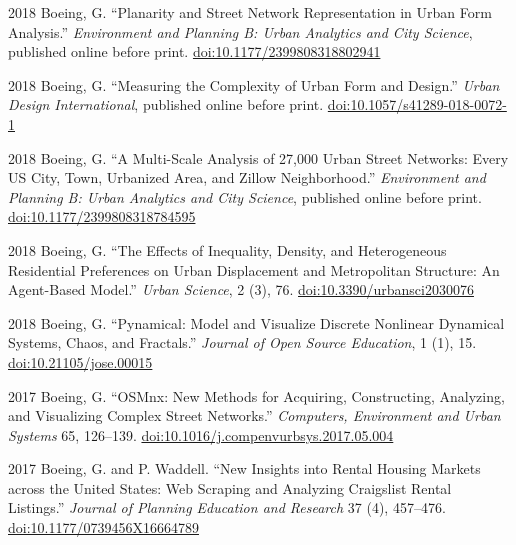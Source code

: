 \documentclass[12pt,letterpaper]{report}
\begin{document}
	\begin{tablist}
		
		\item[2018] \tab Boeing, G. \enquote{Planarity and Street Network Representation in Urban Form Analysis.} \textit{Environment and Planning B: Urban Analytics and City Science}, published online before print. \href{https://doi.org/10.1177/2399808318802941}{doi:10.1177/2399808318802941}
		
		\item[2018] \tab Boeing, G. \enquote{Measuring the Complexity of Urban Form and Design.} \textit{Urban Design International}, published online before print. \href{https://doi.org/10.1057/s41289-018-0072-1}{doi:10.1057/s41289-018-0072-1}
		
		\item[2018] \tab Boeing, G. \enquote{A Multi-Scale Analysis of 27,000 Urban Street Networks: Every US City, Town, Urbanized Area, and Zillow Neighborhood.} \textit{Environment and Planning B: Urban Analytics and City Science}, published online before print. \href{https://doi.org/10.1177/2399808318784595}{doi:10.1177/2399808318784595}
		
		\item[2018] \tab Boeing, G. \enquote{The Effects of Inequality, Density, and Heterogeneous Residential Preferences on Urban Displacement and Metropolitan Structure: An Agent-Based Model.} \textit{Urban Science}, 2 (3), 76. \href{https://doi.org/10.3390/urbansci2030076}{doi:10.3390/urbansci2030076}
		
		\item[2018] \tab Boeing, G. \enquote{Pynamical: Model and Visualize Discrete Nonlinear Dynamical Systems, Chaos, and Fractals.} \textit{Journal of Open Source Education}, 1 (1), 15. \href{https://doi.org/10.21105/jose.00015}{doi:10.21105/jose.00015}
		
		\item[2017] \tab Boeing, G. \enquote{OSMnx: New Methods for Acquiring, Constructing, Analyzing, and Visualizing Complex Street Networks.} \textit{Computers, Environment and Urban Systems} 65, 126--139. \href{https://doi.org/10.1016/j.compenvurbsys.2017.05.004}{doi:10.1016/j.compenvurbsys.2017.05.004}
		
		\item[2017] \tab Boeing, G. and P. Waddell. \enquote{New Insights into Rental Housing Markets across the United States: Web Scraping and Analyzing Craigslist Rental Listings.} \textit{Journal of Planning Education and Research} 37 (4), 457--476. \href{https://doi.org/10.1177/0739456X16664789}{doi:10.1177/0739456X16664789}
		

\end{tablist}
\end{document}
